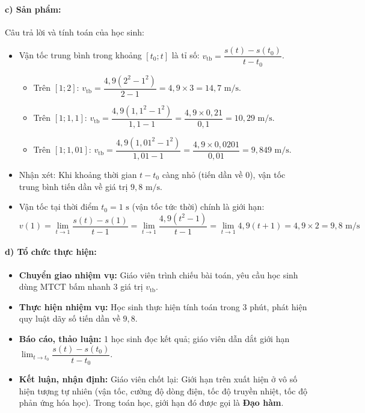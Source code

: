\documentclass[12pt, a4paper]{article}
\begin{document}
\paragraph{c) Sản phẩm:} Câu trả lời và tính toán của học sinh:
\begin{itemize}[leftmargin=0.8cm]
    \item Vận tốc trung bình trong khoảng $[t_0; t]$ là tỉ số: $v_{\text{tb}} = \dfrac{s(t) - s(t_0)}{t - t_0}$.
    \begin{itemize}[leftmargin=0.4cm]
        \item Trên $[1; 2]$: $v_{\text{tb}} = \dfrac{4{,}9(2^2 - 1^2)}{2 - 1} = 4{,}9 \times 3 = 14{,}7\text{ m/s}$.
        \item Trên $[1; 1{,}1]$: $v_{\text{tb}} = \dfrac{4{,}9(1{,}1^2 - 1^2)}{1{,}1 - 1} = \dfrac{4{,}9 \times 0{,}21}{0{,}1} = 10{,}29\text{ m/s}$.
        \item Trên $[1; 1{,}01]$: $v_{\text{tb}} = \dfrac{4{,}9(1{,}01^2 - 1^2)}{1{,}01 - 1} = \dfrac{4{,}9 \times 0{,}0201}{0{,}01} = 9{,}849\text{ m/s}$.
    \end{itemize}
    \item Nhận xét: Khi khoảng thời gian $t - t_0$ càng nhỏ (tiến dần về $0$), vận tốc trung bình tiến dần về giá trị $9{,}8\text{ m/s}$.
    \item Vận tốc tại thời điểm $t_0 = 1\text{ s}$ (vận tốc tức thời) chính là giới hạn:
    $$v(1) = \lim_{t \to 1} \dfrac{s(t) - s(1)}{t - 1} = \lim_{t \to 1} \dfrac{4{,}9(t^2 - 1)}{t - 1} = \lim_{t \to 1} 4{,}9(t + 1) = 4{,}9 \times 2 = 9{,}8\text{ m/s}$$
\end{itemize}

\paragraph{d) Tổ chức thực hiện:}
\begin{itemize}[leftmargin=0.8cm]
    \item \textbf{Chuyển giao nhiệm vụ:} Giáo viên trình chiếu bài toán, yêu cầu học sinh dùng MTCT bấm nhanh 3 giá trị $v_{\text{tb}}$.
    \item \textbf{Thực hiện nhiệm vụ:} Học sinh thực hiện tính toán trong 3 phút, phát hiện quy luật dãy số tiến dần về $9{,}8$.
    \item \textbf{Báo cáo, thảo luận:} 1 học sinh đọc kết quả; giáo viên dẫn dắt giới hạn $\lim_{t \to t_0} \dfrac{s(t) - s(t_0)}{t - t_0}$.
    \item \textbf{Kết luận, nhận định:} Giáo viên chốt lại: Giới hạn trên xuất hiện ở vô số hiện tượng tự nhiên (vận tốc, cường độ dòng điện, tốc độ truyền nhiệt, tốc độ phản ứng hóa học). Trong toán học, giới hạn đó được gọi là \textbf{Đạo hàm}.
\end{itemize}
\end{document}

